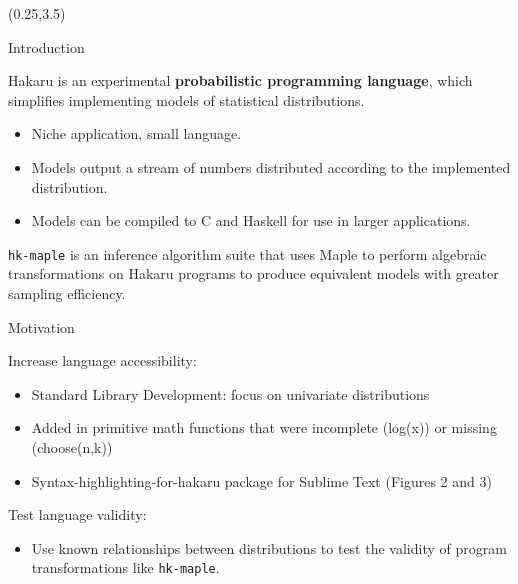 \documentclass[22pt]{beamer}
\begin{document}
\begin{frame}[fragile]
\begin{textblock}{5}(0.25,3.5)


\begin{block}{\Large{Introduction}}
\justifying

\footnotesize{Hakaru is an experimental \textbf{probabilistic programming language}, which simplifies implementing models of statistical distributions.

\begin{itemize}
    \item Niche application, small language.
    \item Models output a stream of numbers  distributed according to the implemented distribution.
    \item Models can be compiled to C and Haskell for use in larger applications.
\end{itemize}

}

\bigskip
\footnotesize{{\tt \footnotesize{hk-maple}} is an inference algorithm suite that uses Maple to perform algebraic transformations on Hakaru programs to produce equivalent models with greater sampling efficiency.}

\end{block}


\begin{block}{\Large{Motivation}}
\justifying

\bigskip
\footnotesize{Increase language accessibility:
\begin{itemize}
  \item Standard Library Development: focus on univariate distributions
  \item Added in primitive math functions that were incomplete (log(x)) or missing (choose(n,k)) 
  \item Syntax-highlighting-for-hakaru package for Sublime Text (Figures 2 and 3)
\end{itemize}
}

\bigskip
\footnotesize{Test language validity: 
\begin{itemize}
  \item Use known relationships between distributions to test the validity of program transformations like {\tt \footnotesize{hk-maple}}.
\end{itemize} }
\justifying



\end{block}
\end{textblock}
\end{frame}
\end{document}
